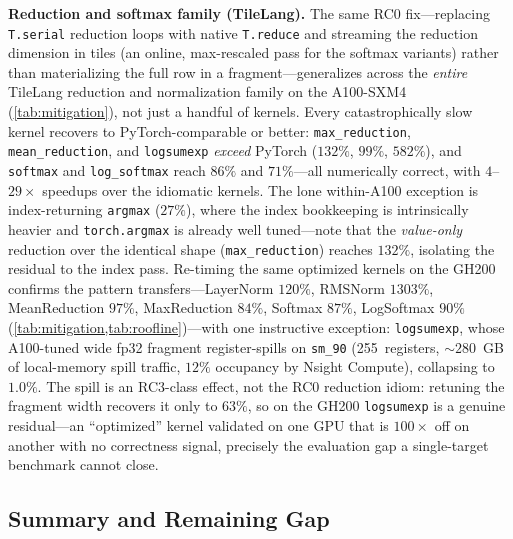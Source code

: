 \textbf{Reduction and softmax family (TileLang).}
The same RC0 fix---replacing \texttt{T.serial} reduction loops with native \texttt{T.reduce}
and streaming the reduction dimension in tiles (an online, max-rescaled pass for the softmax
variants) rather than materializing the full row in a fragment---generalizes across the
\emph{entire} TileLang reduction and normalization family on the A100-SXM4 (\cref{tab:mitigation}), not
just a handful of kernels. Every catastrophically slow kernel recovers to
PyTorch-comparable or better: \texttt{max\_reduction}, \texttt{mean\_reduction}, and
\texttt{logsumexp} \emph{exceed} PyTorch ($132\%$, $99\%$, $582\%$), and \texttt{softmax} and
\texttt{log\_softmax} reach $86\%$ and $71\%$---all numerically correct, with $4$--$29\times$
speedups over the idiomatic kernels. The lone within-A100 exception is
index-returning \texttt{argmax} ($27\%$), where the index bookkeeping is intrinsically heavier
and \texttt{torch.argmax} is already well tuned---note that the \emph{value-only} reduction over
the identical shape (\texttt{max\_reduction}) reaches $132\%$, isolating the residual to the index pass.
Re-timing the same optimized kernels on the GH200 confirms the pattern transfers---LayerNorm $120\%$,
RMSNorm $1303\%$, MeanReduction $97\%$, MaxReduction $84\%$, Softmax $87\%$, LogSoftmax $90\%$
(\cref{tab:mitigation,tab:roofline})---with one instructive exception: \texttt{logsumexp}, whose
A100-tuned wide fp32 fragment register-spills on \texttt{sm\_90} (255~registers, ${\sim}280$~GB of
local-memory spill traffic, $12\%$ occupancy by Nsight Compute), collapsing to $1.0\%$. The spill is an RC3-class effect, not
the RC0 reduction idiom: retuning the fragment width recovers it only to $63\%$, so on the GH200
\texttt{logsumexp} is a genuine residual---an ``optimized'' kernel validated on one GPU that is
$100\times$ off on another with no correctness signal, precisely the evaluation gap a single-target benchmark cannot close.

\subsection{Summary and Remaining Gap}
\label{sec:mitig:summary}

